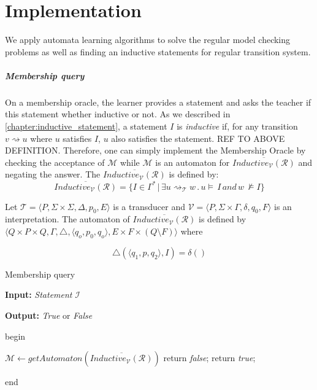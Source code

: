 \chapter{Implementation}\label{chapter:implementation}

We apply automata learning algorithms to solve the regular model checking problems
as well as finding an inductive statements for regular transition system.

\paragraph*{Membership query}
On a membership oracle, the learner provides a statement and asks the teacher if 
this statement whether inductive or not. As we described in \autoref{chapter:inductive_statement}, 
a statement $I$ is \textit{inductive} if, for any transition $v \rightsquigarrow u$
where $u$ satisfies $I$, $u$ also satisfies the statement.
REF TO ABOVE DEFINITION.
Therefore, one can simply implement the Membership Oracle by checking the acceptance 
of $\mathcal{M}$ while $\mathcal{M}$ is an automaton for 
$\overline{Inductive_{\mathcal{V}}(\mathcal{R})}$ and negating the answer.
The $\overline{Inductive_{\mathcal{V}}(\mathcal{R})}$ is defined by:
\[ \overline{Inductive_{\mathcal{V}}(\mathcal{R})} = \lbrace I \in \Gamma^* \, | \, \exists u
\rightsquigarrow_\mathcal{T} w \, . \, u \models \, I \, and \, w \, \not\models I\rbrace
\]

Let $\mathcal{T} =  \langle P, \Sigma \times \Sigma, \Delta, p_0, E \rangle$ 
is a transducer and  $\mathcal{V} =  \langle P, \Sigma \times \Gamma, \delta, q_0, F \rangle$ is 
an interpretation. The automaton of $\overline{Inductive_{\mathcal{V}}(\mathcal{R})}$ 
is defined by $\langle Q \times P \times Q, \Gamma, \triangle, \langle q_o,  p_0, q_o \rangle, 
E \times F \times (Q \setminus F) \rangle$ where

\[
    \triangle(\langle q_1, p, q_2 \rangle, I) = \delta()
\]


\begin{algorithm}
\caption{Membership query}\label{alg:membership}
\textbf{Input: } \textit{Statement} $\mathcal{I}$ 

\textbf{Output: } \textit{True} or \textit{False}

begin
\begin{algorithmic}
    \State $\mathcal{M} \gets getAutomaton(\overline{Inductive_{\mathcal{V}}(\mathcal{R})})$
        \State return \textit{false};
    \Else
        \State return \textit{true};
    \EndIf
\end{algorithmic}
end
\end{algorithm}


